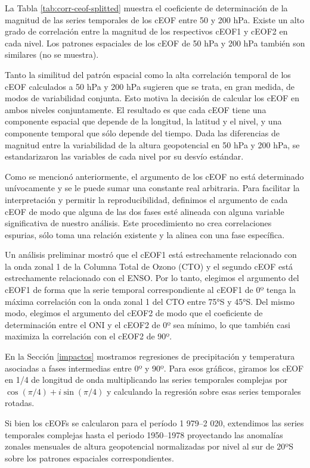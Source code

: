 \documentclass[12pt,oneside,a4paper]{reedthesis}
\begin{document}
La Tabla \ref{tab:corr-ceof-splitted} muestra el coeficiente de determinación de la magnitud de las series temporales de los cEOF entre 50 y 200 hPa.
Existe un alto grado de correlación entre la magnitud de los respectivos cEOF1 y cEOF2 en cada nivel.
Los patrones espaciales de los cEOF de 50 hPa y 200 hPa también son similares (no se muestra).

Tanto la similitud del patrón espacial como la alta correlación temporal de los cEOF calculados a 50 hPa y 200 hPa sugieren que se trata, en gran medida, de modos de variabilidad conjunta.
Esto motiva la decisión de calcular los cEOF en ambos niveles conjuntamente.
El resultado es que cada cEOF tiene una componente espacial que depende de la longitud, la latitud y el nivel, y una componente temporal que sólo depende del tiempo.
Dada las diferencias de magnitud entre la variabilidad de la altura geopotencial en 50 hPa y 200 hPa, se estandarizaron las variables de cada nivel por su desvío estándar.

Como se mencionó anteriormente, el argumento de los cEOF no está determinado unívocamente y se le puede sumar una constante real arbitraria.
Para facilitar la interpretación y permitir la reproducibilidad, definimos el argumento de cada cEOF de modo que alguna de las dos fases esté alineada con alguna variable significativa de nuestro análisis.
Este procedimiento no crea correlaciones espurias, sólo toma una relación existente y la alinea con una fase específica.

Un análisis preliminar mostró que el cEOF1 está estrechamente relacionado con la onda zonal 1 de la Columna Total de Ozono (CTO) y el segundo cEOF está estrechamente relacionado con el ENSO.
Por lo tanto, elegimos el argumento del cEOF1 de forma que la serie temporal correspondiente al cEOF1 de 0º tenga la máxima correlación con la onda zonal 1 del CTO entre 75°S y 45°S.
Del mismo modo, elegimos el argumento del cEOF2 de modo que el coeficiente de determinación entre el ONI y el cEOF2 de 0º sea mínimo, lo que también casi maximiza la correlación con el cEOF2 de 90º.

En la Sección \ref{impactos} mostramos regresiones de precipitación y temperatura asociadas a fases intermedias entre 0º y 90º.
Para esos gráficos, giramos los cEOF en 1/4 de longitud de onda multiplicando las series temporales complejas por \(\cos(\pi/4) + i\sin(\pi/4)\) y calculando la regresión sobre esas series temporales rotadas.

Si bien los cEOFs se calcularon para el período 1 979--2 020, extendimos las series temporales complejas hasta el periodo 1950--1978 proyectando las anomalías zonales mensuales de altura geopotencial normalizadas por nivel al sur de 20ºS sobre los patrones espaciales correspondientes.
\end{document}
